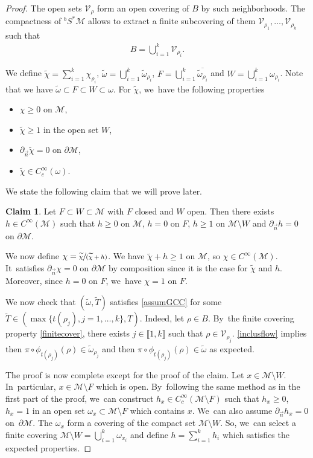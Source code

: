 \documentclass[10pt]{amsart}
\newcommand{\spfrac}[2]{\sfrac{#1}{(#2)}}
\theoremstyle{definition}
\newtheorem*{claim}{Claim}
\let\mc\mathcal
\newcommand{\M}{\mc{M}}
\begin{document}
\begin{proof}
The open sets $\mc{V}_{\rho}$ form an open covering of $B$ by such neighborhoods. The compactness of $^bS^*\M$ allows to extract a finite subcovering of them $\mc{V}_{\rho_1},\ldots, \mc{V}_{\rho_k}$ such that
\begin{align}
\label{finitecover}B=\bigcup_{i=1}^{k}\mc{V}_{\rho_{i}}.
\end{align}

We define $\widetilde{\chi}=\sum_{i=1}^{k}\chi_{\rho_{i}}$, $\widetilde{\omega}=\bigcup_{i=1}^{k}\widetilde{\omega}_{\rho_i}$, $F=\bigcup_{i=1}^{k}\overline{\widetilde{\omega}_{\rho_i}}$ and $W=\bigcup_{i=1}^{k}\omega_{\rho_i}$. Note that we have $ \widetilde{\omega}\subset F\subset W\subset \omega$. For $\widetilde{\chi}$, we~have the following properties \begin{itemize}
\item $\chi\geq 0$ on $\M$,
\item $\widetilde{\chi}\geq 1$ in the open set $W$,
\item $\partial_{\vec n}\widetilde{\chi}=0$ on $\partial \M$,
\item $\widetilde{\chi}\in C^{\infty}_c(\omega)$.
\end{itemize}
We state the following claim that we will prove later.

\begin{claim} Let $F\subset W\subset \M$ with $F$ closed and $W$ open. Then there exists $h\in C^{\infty}(\M)$ such that $h\geq 0$ on $\M$, $h=0$ on $F$, $h\geq 1$ on $\M\setminus W$ and $\partial_{\vec n}h=0$ on $\partial \M$.
\end{claim}

We now define $\chi=\spfrac{\widetilde{\chi}}{\widetilde{\chi}+h}$. We have $\widetilde{\chi}+h\geq 1$ on $\M$, so $\chi\in C^{\infty}(\M)$. It~satisfies $\partial_{\vec n}\chi=0$ on $\partial \M$ by composition since it is the case for $\widetilde{\chi}$ and $h$. Moreover, since $h=0$ on $F$, we~have $\chi=1$ on $F$.

We now check that $(\widetilde{\omega},\widetilde{T})$ satisfies \ref{assumGCC} for some $\widetilde{T}\in (\max\{t(\rho_j),j=1,\dots, k\}, T)$.
Indeed, let $\rho \in B$. By~the finite covering property \eqref{finitecover}, there exists $j\in \llbracket 1,k \rrbracket $ such that $\rho\in \mc{V}_{\rho_j}$. \eqref{inclusflow} implies then $\pi\circ\phi_{t(\rho_{j})}(\rho)\in \widetilde{\omega}_{\rho_{j}}$ and then $\pi\circ\phi_{t(\rho_{j})}(\rho)\in\widetilde{\omega}$ as expected.

The proof is now complete except for the proof of the claim.
Let $x\in \M\setminus W$. In~particular, $x\in \M \setminus F$ which is open. By~following the same method as in the first part of the proof, we~can construct $h_{x} \in C^{\infty}_c(\M \setminus F)$ such that $h_{x}\geq 0$, $h_{x}=1$ in an open set $\omega_{x}\subset \M\setminus F$ which contains $x$. We~can also assume $\partial_{\vec n}h_{x}=0$ on~$\partial \M$. The $\omega_{x}$ form a covering of the compact set $\M\setminus W$. So, we~can select a finite covering $\M\setminus W=\bigcup_{i=1}^{k} \omega_{x_{i}}$ and define $h=\sum_{i=1}^{k}h_{i}$ which satisfies the expected properties.
\end{proof}
\end{document}
